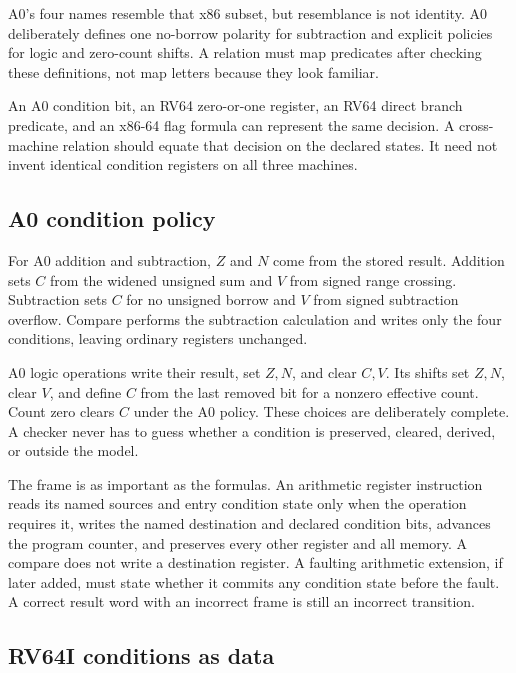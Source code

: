 A0's four names resemble that x86 subset, but resemblance is not identity.
A0 deliberately defines one no-borrow polarity for subtraction and explicit
policies for logic and zero-count shifts. A relation must map predicates after
checking these definitions, not map letters because they look familiar.

\begin{sidebar}[title={Compare information, not storage shapes}]
An A0 condition bit, an RV64 zero-or-one register, an RV64 direct branch
predicate, and an x86-64 flag formula can represent the same decision. A
cross-machine relation should equate that decision on the declared states. It
need not invent identical condition registers on all three machines.
\end{sidebar}

\subsection{A0 condition policy}

For A0 addition and subtraction, \(Z\) and \(N\) come from the stored result.
Addition sets \(C\) from the widened unsigned sum and \(V\) from signed range
crossing. Subtraction sets \(C\) for no unsigned borrow and \(V\) from signed
subtraction overflow. Compare performs the subtraction calculation and writes
only the four conditions, leaving ordinary registers unchanged.

A0 logic operations write their result, set \(Z,N\), and clear \(C,V\). Its
shifts set \(Z,N\), clear \(V\), and define \(C\) from the last removed bit for
a nonzero effective count. Count zero clears \(C\) under the A0 policy. These
choices are deliberately complete. A checker never has to guess whether a
condition is preserved, cleared, derived, or outside the model.

The frame is as important as the formulas. An arithmetic register instruction
reads its named sources and entry condition state only when the operation
requires it, writes the named destination and declared condition bits, advances
the program counter, and preserves every other register and all memory. A
compare does not write a destination register. A faulting arithmetic extension,
if later added, must state whether it commits any condition state before the
fault. A correct result word with an incorrect frame is still an incorrect
transition.

\subsection{RV64I conditions as data}

